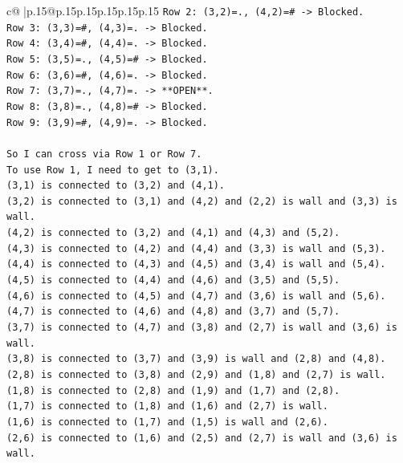 \documentclass{article}
\begin{document}
{\begin{supertabular}{c@{$\;$}|p{.15\linewidth}@{}p{.15\linewidth}p{.15\linewidth}p{.15\linewidth}p{.15\linewidth}p{.15\linewidth}}
{{{\texttt{Row 2: (3,2)=., (4,2)=\# {-}> Blocked.} \\
\texttt{Row 3: (3,3)=\#, (4,3)=. {-}> Blocked.} \\
\texttt{Row 4: (3,4)=\#, (4,4)=. {-}> Blocked.} \\
\texttt{Row 5: (3,5)=., (4,5)=\# {-}> Blocked.} \\
\texttt{Row 6: (3,6)=\#, (4,6)=. {-}> Blocked.} \\
\texttt{Row 7: (3,7)=., (4,7)=. {-}> **OPEN**.} \\
\texttt{Row 8: (3,8)=., (4,8)=\# {-}> Blocked.} \\
\texttt{Row 9: (3,9)=\#, (4,9)=. {-}> Blocked.} \\
\\ 
\texttt{So I can cross via Row 1 or Row 7.} \\
\texttt{To use Row 1, I need to get to (3,1).} \\
\texttt{(3,1) is connected to (3,2) and (4,1).} \\
\texttt{(3,2) is connected to (3,1) and (4,2) and (2,2) is wall and (3,3) is wall.} \\
\texttt{(4,2) is connected to (3,2) and (4,1) and (4,3) and (5,2).} \\
\texttt{(4,3) is connected to (4,2) and (4,4) and (3,3) is wall and (5,3).} \\
\texttt{(4,4) is connected to (4,3) and (4,5) and (3,4) is wall and (5,4).} \\
\texttt{(4,5) is connected to (4,4) and (4,6) and (3,5) and (5,5).} \\
\texttt{(4,6) is connected to (4,5) and (4,7) and (3,6) is wall and (5,6).} \\
\texttt{(4,7) is connected to (4,6) and (4,8) and (3,7) and (5,7).} \\
\texttt{(3,7) is connected to (4,7) and (3,8) and (2,7) is wall and (3,6) is wall.} \\
\texttt{(3,8) is connected to (3,7) and (3,9) is wall and (2,8) and (4,8).} \\
\texttt{(2,8) is connected to (3,8) and (2,9) and (1,8) and (2,7) is wall.} \\
\texttt{(1,8) is connected to (2,8) and (1,9) and (1,7) and (2,8).} \\
\texttt{(1,7) is connected to (1,8) and (1,6) and (2,7) is wall.} \\
\texttt{(1,6) is connected to (1,7) and (1,5) is wall and (2,6).} \\
\texttt{(2,6) is connected to (1,6) and (2,5) and (2,7) is wall and (3,6) is wall.} \\
}}}
\end{supertabular}}
\end{document}
